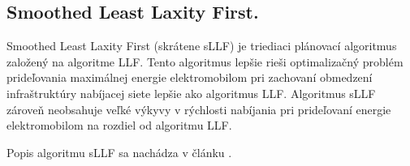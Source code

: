 




\subsection{Smoothed Least Laxity First.}
Smoothed Least Laxity First (skrátene sLLF) je triediaci plánovací algoritmus založený na algoritme LLF. Tento algoritmus lepšie rieši optimalizačný problém prideľovania maximálnej energie elektromobilom pri zachovaní obmedzení infraštruktúry nabíjacej siete lepšie ako algoritmus LLF. Algoritmus sLLF zároveň neobsahuje veľké výkyvy v rýchlosti nabíjania pri prideľovaní energie elektromobilom na rozdiel od algoritmu LLF.

Popis algoritmu sLLF sa nachádza v článku \cite{chen2021smoothed}.

